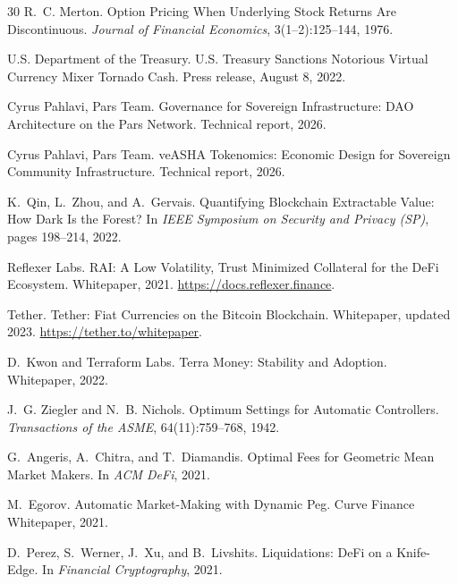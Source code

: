 \documentclass[11pt,a4paper]{article}
\begin{document}
\begin{thebibliography}{30}
R.~C. Merton.
\newblock Option Pricing When Underlying Stock Returns Are Discontinuous.
\newblock \emph{Journal of Financial Economics}, 3(1--2):125--144, 1976.

U.S. Department of the Treasury.
\newblock U.S. Treasury Sanctions Notorious Virtual Currency Mixer Tornado Cash.
\newblock Press release, August 8, 2022.

Cyrus Pahlavi, Pars Team.
\newblock Governance for Sovereign Infrastructure: DAO Architecture on the Pars Network.
\newblock Technical report, 2026.

Cyrus Pahlavi, Pars Team.
\newblock veASHA Tokenomics: Economic Design for Sovereign Community Infrastructure.
\newblock Technical report, 2026.

K.~Qin, L.~Zhou, and A.~Gervais.
\newblock Quantifying Blockchain Extractable Value: How Dark Is the Forest?
\newblock In \emph{IEEE Symposium on Security and Privacy (SP)}, pages 198--214, 2022.

Reflexer Labs.
\newblock RAI: A Low Volatility, Trust Minimized Collateral for the DeFi Ecosystem.
\newblock Whitepaper, 2021.
\newblock \url{https://docs.reflexer.finance}.

Tether.
\newblock Tether: Fiat Currencies on the Bitcoin Blockchain.
\newblock Whitepaper, updated 2023.
\newblock \url{https://tether.to/whitepaper}.

D.~Kwon and Terraform Labs.
\newblock Terra Money: Stability and Adoption.
\newblock Whitepaper, 2022.

J.~G. Ziegler and N.~B. Nichols.
\newblock Optimum Settings for Automatic Controllers.
\newblock \emph{Transactions of the ASME}, 64(11):759--768, 1942.

G.~Angeris, A.~Chitra, and T.~Diamandis.
\newblock Optimal Fees for Geometric Mean Market Makers.
\newblock In \emph{ACM DeFi}, 2021.

M.~Egorov.
\newblock Automatic Market-Making with Dynamic Peg.
\newblock Curve Finance Whitepaper, 2021.

D.~Perez, S.~Werner, J.~Xu, and B.~Livshits.
\newblock Liquidations: DeFi on a Knife-Edge.
\newblock In \emph{Financial Cryptography}, 2021.


\end{thebibliography}
\end{document}
